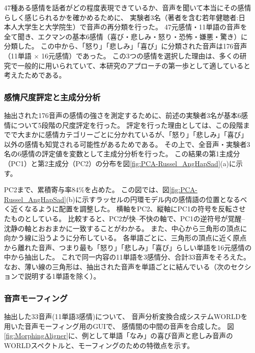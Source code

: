 47種ある感情を話者がどの程度表現できているか、音声を聞いて本当にその感情らしく感じられるかを確かめるために、
実験者3名（著者を含む若年健聴者:日本人大学生と大学院生）で音声の再分類を行った。
47元感情・11単語の音声を全て聞き、エクマンの基本6感情（喜び・悲しみ・怒り・恐怖・嫌悪・驚き）\cite{ekman1992argument}に分類した。
この中から、「怒り」「悲しみ」「喜び」に分類された音声は176音声（11単語 $\times$ 16元感情）であった。
この3つの感情を選択した理由は、多くの研究で一般的に用いられていて、本研究のアプローチの第一歩として適していると考えたためである。

\newpage


\subsubsection{感情尺度評定と主成分分析}
抽出された176音声の感情の強さを測定するために、前述の実験者3名が基本6感情について5段階の尺度評定を行った。
評定を行った理由としては、この段階までで大まかに感情カテゴリーごとに分かれているが、「怒り」「悲しみ」「喜び」以外の感情も知覚される可能性があるためである。
その上で、全音声・実験者3名の6感情の評定値を変数として主成分分析を行った。
この結果の第1主成分（PC1）と第2主成分（PC2）の分布を図\ref{fig:PCA-Russel_AngHapSad}(a)に示す。

PC2まで、累積寄与率84\%を占めた。
この図では、図\ref{fig:PCA-Russel_AngHapSad}(b)に示すラッセルの円環モデル\cite{russell1980circumplex}内の感情語の位置となるべく近くなるように配置を調整した。
横軸をPC2、縦軸にPC1の符号を反転させたものとしている。
比較すると、PC2が快--不快の軸で、PC1の逆符号が覚醒--沈静の軸とおおまかに一致することがわかる。
また、中心から三角形の頂点に向かう線に沿うように分布している。
各単語ごとに、三角形の頂点に近く原点から離れた音声、つまり最も「怒り」「悲しみ」「喜び」らしい単語を16元感情の中から抽出した。
これで同一内容の11単語を3感情分、合計33音声をそろえた。
なお、薄い線の三角形は、抽出された音声を単語ごとに結んでいる（次のセクションで説明する1単語を除く）。





\subsubsection{音声モーフィング}
\label{sec:morphAngSadHap}

抽出した33音声(11単語\time 3感情)について、
音声分析変換合成システムWORLD\cite{morise2016world}を用いた音声モーフィング用のGUI\cite{kawahara2024interactive}で、
感情間の中間の音声を合成した。
図\ref{fig:MorphingAligner}に、例として単語「なみ」の喜び音声と悲しみ音声のWORLDスペクトルと、モーフィングのための特徴点を示す。


